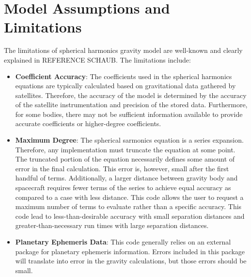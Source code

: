 \section{Model Assumptions and Limitations}
The limitations of spherical harmonics gravity model are well-known and clearly explained in REFERENCE SCHAUB. The limitations include:
\begin{itemize}
	\item \textbf{Coefficient Accuracy}: The coefficients used in the spherical harmonics equations are typically calculated based on gravitational data gathered by satellites. Therefore, the accuracy of the model is determined by the accuracy of the satellite instrumentation and precision of the stored data. Furthermore, for some bodies, there may not be sufficient information available to provide accurate coefficients or higher-degree coefficients.
	\item \textbf{Maximum Degree}: The spherical sarmonics equation is a series expansion. Therefore, any implementation must truncate the equation at some point. The truncated portion of the equation necessarily defines some amount of error in the final calculation. This error is, however, small after the first handful of terms. Additionally, a larger distance between gravity body and spacecraft requires fewer terms of the series to achieve equal accuracy as compared to a case with less distance. This code allows the user to request a maximum number of terms to evaluate rather than a specific accuracy. This code lead to less-than-desirable accuracy with small separation distances and greater-than-necessary run times with large separation distances.
	\item \textbf{Planetary Ephemeris Data}: This code generally relies on an external package for planetary ephemeris information. Errors included in this package will translate into error in the gravity calculations, but those errors should be small.
\end{itemize}